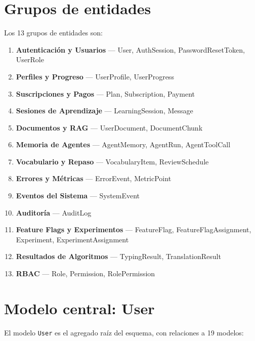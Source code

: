 \documentclass[10pt,a4paper,oneside]{report}
\begin{document}
\section{Grupos de entidades}
Los 13 grupos de entidades son:

\begin{enumerate}[leftmargin=1.6em]
\item \textbf{Autenticación y Usuarios} — User, AuthSession, PasswordResetToken, UserRole
\item \textbf{Perfiles y Progreso} — UserProfile, UserProgress
\item \textbf{Suscripciones y Pagos} — Plan, Subscription, Payment
\item \textbf{Sesiones de Aprendizaje} — LearningSession, Message
\item \textbf{Documentos y RAG} — UserDocument, DocumentChunk
\item \textbf{Memoria de Agentes} — AgentMemory, AgentRun, AgentToolCall
\item \textbf{Vocabulario y Repaso} — VocabularyItem, ReviewSchedule
\item \textbf{Errores y Métricas} — ErrorEvent, MetricPoint
\item \textbf{Eventos del Sistema} — SystemEvent
\item \textbf{Auditoría} — AuditLog
\item \textbf{Feature Flags y Experimentos} — FeatureFlag, FeatureFlagAssignment, Experiment, ExperimentAssignment
\item \textbf{Resultados de Algoritmos} — TypingResult, TranslationResult
\item \textbf{RBAC} — Role, Permission, RolePermission
\end{enumerate}

\section{Modelo central: User}
El modelo \texttt{User} es el agregado raíz del esquema, con relaciones a 19 modelos:
\end{document}
